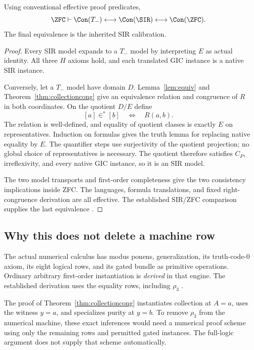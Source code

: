 \begin{corollary}
\label{cor:tminus}
Using conventional effective proof predicates,
\[
 \ZFC\vdash
 \Con(T_-)\longleftrightarrow\Con(\SIR)
 \longleftrightarrow\Con(\ZFC).
\]
The final equivalence is the inherited SIR calibration.
\end{corollary}
\begin{proof}
Every SIR model expands to a $T_-$ model by interpreting
$E$ as actual identity. All three $H$ axioms hold, and
each translated GIC instance is a native SIR instance.

Conversely, let a $T_-$ model have domain $D$.
Lemma~\ref{lem:equiv} and Theorem~\ref{thm:collectioncong}
give an equivalence relation and congruence of $R$ in both
coordinates. On the quotient $D/E$ define
\[
 [a]\in^*[b]\quad\Longleftrightarrow\quad R(a,b).
\]
The relation is well-defined, and equality of quotient classes
is exactly $E$ on representatives. Induction on formulas gives
the truth lemma for replacing native equality by $E$.
The quantifier steps use surjectivity of the quotient projection;
no global choice of representatives is necessary.
The quotient therefore satisfies $C_P$, irreflexivity, and
every native GIC instance, so it is an SIR model.

The two model transports and first-order completeness give
the two consistency implications inside ZFC. The languages,
formula translations, and fixed right-congruence derivation
are all effective. The established SIR/ZFC comparison supplies
the last equivalence \cite{upstream,native,calibration}.
\end{proof}

\subsection{Why this does not delete a machine row}

The actual numerical calculus has modus ponens,
generalization, its truth-code-0 axiom, its eight logical rows, and its gated
bundle as primitive operations. Ordinary arbitrary
first-order instantiation is \emph{derived} in that engine.
The established derivation uses the equality rows,
including $\rho_3$ \cite{tarski}.

The proof of Theorem~\ref{thm:collectioncong} instantiates
collection at $A=a$, uses the witness $y=a$, and specializes
purity at $y=b$. To remove $\rho_3$ from the numerical
machine, these exact inferences would need a numerical
proof scheme using only the remaining rows and permitted
gated instances. The full-logic argument does not supply
that scheme automatically.

